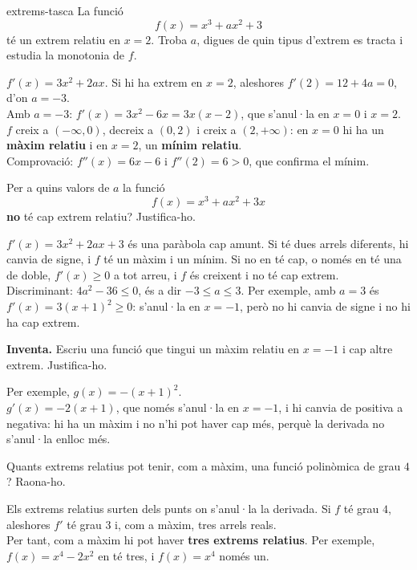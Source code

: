 \begin{apartats}

\begin{tria}{extrems-tasca}
La funció
\[
f(x)=x^3+ax^2+3
\]
té un extrem relatiu en $x=2$. Troba $a$, digues de quin tipus d'extrem es tracta i estudia la
monotonia de $f$.

\begin{solucio}
$f'(x)=3x^2+2ax$. Si hi ha extrem en $x=2$, aleshores $f'(2)=12+4a=0$, d'on $\boxed{a=-3}$.\\
Amb $a=-3$: $f'(x)=3x^2-6x=3x(x-2)$, que s'anul·la en $x=0$ i $x=2$.\\
$f$ creix a $(-\infty,0)$, decreix a $(0,2)$ i creix a $(2,+\infty)$: en $x=0$ hi ha un
\textbf{màxim relatiu} i en $x=2$, un \textbf{mínim relatiu}.\\
Comprovació: $f''(x)=6x-6$ i $f''(2)=6>0$, que confirma el mínim.
\end{solucio}

Per a quins valors de $a$ la funció
\[
f(x)=x^3+ax^2+3x
\]
\textbf{no} té cap extrem relatiu? Justifica-ho.

\begin{solucio}
$f'(x)=3x^2+2ax+3$ és una paràbola cap amunt. Si té dues arrels diferents, hi canvia de signe,
i $f$ té un màxim i un mínim. Si no en té cap, o només en té una de doble, $f'(x)\ge0$ a tot
arreu, i $f$ és creixent i no té cap extrem.\\
Discriminant: $4a^2-36\le0$, és a dir $\boxed{-3\le a\le3}$. Per exemple, amb $a=3$ és
$f'(x)=3(x+1)^2\ge0$: s'anul·la en $x=-1$, però no hi canvia de signe i no hi ha cap extrem.
\end{solucio}
\end{tria}

\begin{nomesllarg}
\textbf{Inventa.} Escriu una funció que tingui un màxim relatiu en $x=-1$ i cap altre extrem.
Justifica-ho.

\begin{solucio}
Per exemple, $g(x)=-(x+1)^2$.\\
$g'(x)=-2(x+1)$, que només s'anul·la en $x=-1$, i hi canvia de positiva a negativa: hi ha un
màxim i no n'hi pot haver cap més, perquè la derivada no s'anul·la enlloc més.
\end{solucio}
\end{nomesllarg}

Quants extrems relatius pot tenir, com a màxim, una funció polinòmica de grau $4$? Raona-ho.

\begin{solucio}
Els extrems relatius surten dels punts on s'anul·la la derivada. Si $f$ té grau $4$, aleshores
$f'$ té grau $3$ i, com a màxim, tres arrels reals.\\
Per tant, com a màxim hi pot haver \textbf{tres extrems relatius}. Per exemple,
$f(x)=x^4-2x^2$ en té tres, i $f(x)=x^4$ només un.
\end{solucio}

\end{apartats}
